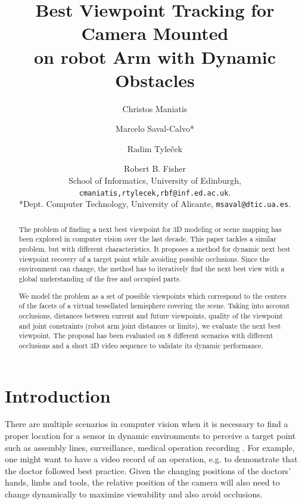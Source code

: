 \documentclass[10pt,twocolumn,letterpaper]{article}
\begin{document}
\title{Best Viewpoint Tracking for Camera Mounted \\on robot Arm with Dynamic Obstacles}

\author{Christos Maniatis \and Marcelo Saval-Calvo* \and Radim Tyle{\v c}ek \and Robert B. Fisher\\
School of Informatics, University of Edinburgh, \texttt{cmaniatis,rtylecek,rbf@inf.ed.ac.uk}.\\
*Dept. Computer Technology, University of Alicante, \texttt{msaval@dtic.ua.es}.
}

\maketitle
\thispagestyle{empty}

\begin{abstract}
The problem of finding a next best viewpoint for 3D modeling or scene mapping has been explored in computer vision over the last decade. 
This paper tackles a similar problem, but with different characteristics.
It proposes a method for dynamic next best viewpoint recovery of a target point while avoiding possible occlusions. 
Since the environment can change, the method has to iteratively find the next best view with a global understanding of the free and occupied parts. 

We model the problem as a set of possible viewpoints which correspond to the centers of the facets of a virtual tessellated hemisphere covering the scene. 
Taking into account occlusions, distances between current and future viewpoints, quality of the viewpoint and joint constraints (robot arm joint distances or limits), we evaluate the next best viewpoint. 
The proposal has been evaluated on 8 different scenarios with different occlusions and a short 3D video sequence to validate its dynamic performance.  
\end{abstract}

\section{Introduction}\label{sec:intro}
There are multiple scenarios in computer vision when it is necessary to find a proper location for a sensor in dynamic environments to perceive a target point such as assembly lines, surveillance, medical operation recording \cite{Gambadauro2012}. For example, one might want to have a video record of an operation, e.g. to demonstrate that the doctor followed best practice. Given the changing positions of the doctors' hands, limbs and tools, the relative position of the camera will also need to change dynamically to maximize viewability and also avoid occlusions. 
\end{document}
